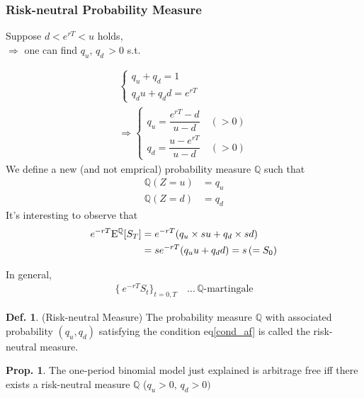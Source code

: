 \documentclass[a4paper,11pt]{jsarticle}
\theoremstyle{definition}
\newtheorem{definition}{Def.}[subsection]
\newtheorem{prop}{Prop.}[subsection]
\newcommand{\df}[2]{\dfrac{#1}{#2}}
\begin{document}
\subsubsection{Risk-neutral Probability Measure}
Suppose $d<e^{rT}<u$ holds, \\
$\Rightarrow$ one can find $q_u, \, q_d \, >0$ s.t.

\begin{align}
  \begin{cases}
    q_u+q_d=1 \\
    q_d u+q_d d=e^{rT}
  \end{cases} \\
  \Rightarrow
  \begin{cases}
    q_u=\df{e^{rT}-d}{u-d} \quad (>0) \\
    q_d=\df{u-e^{rT}}{u-d} \quad (>0)
  \end{cases}
\end{align}
We define a new (and not emprical) probability measure
$\mathbb{Q}$ such that
\begin{align}
  \mathbb{Q}(Z=u)&=q_u \\
  \mathbb{Q}(Z=d)&=q_d
\end{align}
It's interesting to observe that
\begin{align}
  e^{-rT}\mathrm{E}^{\mathbb{Q}}[S_T]
  &=e^{-rT}(q_u\times su+q_d\times sd) \notag \\
  &=se^{-rT}(q_u u+q_d d)=s\,(=S_0)
\end{align}

In general,
\begin{align}
  \{\ e^{-rT}S_t \}_{t=0,T} \quad ... \, \mathbb{Q}
  \mbox{-martingale}
\end{align}

\begin{definition}{(Risk-neutral Measure)}
  The probability measure $\mathbb{Q}$ with associated
  probability $(q_u, q_d)$ satisfying the condition
  eq\eqref{cond_af} is called the risk-neutral measure.
\end{definition}

\begin{prop}
  The one-period binomial model just explained is arbitrage
  free iff there exists a risk-neutral measure
  $\mathbb{Q}$ ($q_u>0,\, q_d>0)$
\end{prop}
\end{document}
